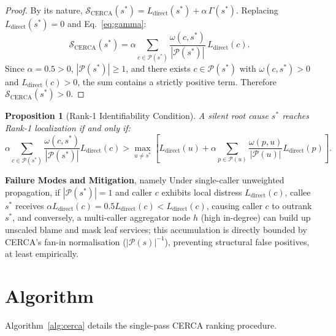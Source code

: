 \documentclass[conference]{IEEEtran}
\newtheorem{proposition}{Proposition}
\begin{document}
\begin{proof}
By its nature, $\mathcal{S}_{\mathrm{CERCA}}(s^*) = L_{\mathrm{direct}}(s^*) + \alpha\,\Gamma(s^*)$. Replacing $L_{\mathrm{direct}}(s^*) = 0$ and Eq.~\eqref{eq:gamma}:
\begin{equation}
\mathcal{S}_{\mathrm{CERCA}}(s^*) = \alpha \sum_{c \in \mathcal{P}(s^*)} \frac{\omega(c, s^*)}{|\mathcal{P}(s^*)|}\,L_{\mathrm{direct}}(c).
\end{equation}
Since $\alpha = 0.5 > 0$, $|\mathcal{P}(s^*)| \geq 1$, and there exists $c \in \mathcal{P}(s^*)$ with $\omega(c, s^*) > 0$ and $L_{\mathrm{direct}}(c) > 0$, the sum contains a strictly positive term. Therefore $\mathcal{S}_{\mathrm{CERCA}}(s^*) > 0$.
\end{proof}

\begin{proposition}[Rank-1 Identifiability Condition]
A silent root cause $s^*$ reaches Rank-1 localization if and only if:
\begin{equation}
\alpha \sum_{c \in \mathcal{P}(s^*)} \frac{\omega(c, s^*)}{|\mathcal{P}(s^*)|} L_{\mathrm{direct}}(c) > \max_{u \neq s^*} \left[ L_{\mathrm{direct}}(u) + \alpha \sum_{p \in \mathcal{P}(u)} \frac{\omega(p, u)}{|\mathcal{P}(u)|} L_{\mathrm{direct}}(p) \right].
\end{equation}
\end{proposition}

\textbf{Failure Modes and Mitigation}, namely Under single-caller unweighted propagation, if $|\mathcal{P}(s^*)| = 1$ and caller $c$ exhibits local distress $L_{\mathrm{direct}}(c)$, callee $s^*$ receives $\alpha L_{\mathrm{direct}}(c) = 0.5 L_{\mathrm{direct}}(c) < L_{\mathrm{direct}}(c)$, causing caller $c$ to outrank $s^*$, and conversely, a multi-caller aggregator node $h$ (high in-degree) can build up unscaled blame and mask leaf services; this accumulation is directly bounded by CERCA's fan-in normalisation ($|\mathcal{P}(s)|^{-1}$), preventing structural false positives, at least empirically.

\section{Algorithm}

Algorithm~\ref{alg:cerca} details the single-pass CERCA ranking procedure.
\end{document}
